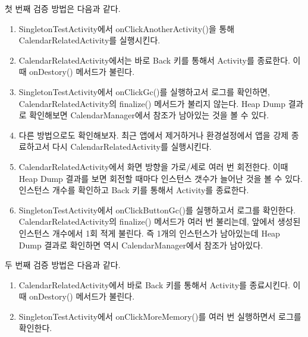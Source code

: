 첫 번째 검증 방법은 다음과 같다.
\begin{enumerate}
\item SingletonTestActivity에서 onClickAnotherActivity()을 통해 CalendarRelatedActivity를 실행시킨다.

\item CalendarRelatedActivity에서는 바로 Back 키를 통해서 Activity를 종료한다. 이때 onDestory() 메서드가 불린다.

\item SingletonTestActivity에서 onClickGc()를 실행하고서 로그를 확인하면, CalendarRelatedActivity의 finalize() 메서드가 불리지 않는다. Heap Dump 결과로 확인해보면 CalendarManager에서 참조가 남아있는 것을 볼 수 있다. 

\item 다른 방법으로도 확인해보자. 최근 앱에서 제거하거나 환경설정에서 앱을 강제 종료하고서 다시 CalendarRelatedActivity를 실행시킨다.

\item CalendarRelatedActivity에서 화면 방향을 가로/세로 여러 번 회전한다. 이때 Heap Dump 결과를 보면 회전할 때마다 인스턴스 갯수가 늘어난 것을 볼 수 있다. 
인스턴스 개수를 확인하고 Back 키를 통해서 Activity를 종료한다.

\item SingletonTestActivity에서 onClickButtonGc()를 실행하고서 로그를 확인한다. CalendarRelatedActivity의 finalize() 메서드가 여러 번 불리는데, 앞에서 생성된 인스턴스 개수에서 1회 적게 불린다. 
즉 1개의 인스턴스가 남아있는데 Heap Dump 결과로 확인하면 역시 CalendarManager에서 참조가 남아있다.
\end{enumerate}

두 번째 검증 방법은 다음과 같다.
\begin{enumerate}
\item CalendarRelatedActivity에서 바로 Back 키를 통해서 Activity를 종료시킨다. 이때 onDestory() 메서드가 불린다.
\item SingletonTestActivity에서 onClickMoreMemory()를 여러 번 실행하면서 로그를 확인한다.
\end{enumerate}

